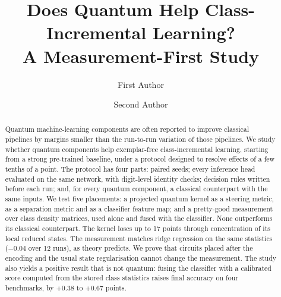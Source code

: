 \documentclass[runningheads]{llncs}
\begin{document}
\title{Does Quantum Help Class-Incremental Learning?\\
A Measurement-First Study}  %
\author{First Author \and Second Author}  %

\maketitle

\begin{abstract}
Quantum machine-learning components are often reported to improve classical
pipelines by margins smaller than the run-to-run variation of those
pipelines. We study whether quantum components help exemplar-free
class-incremental learning, starting from a strong pre-trained baseline,
under a protocol designed to resolve effects of a few tenths of a point.
The protocol has four parts: paired seeds; every inference head evaluated
on the same network, with digit-level identity checks; decision rules
written before each run; and, for every quantum component, a classical
counterpart with the same inputs. We test five placements: a projected
quantum kernel as a steering metric, as a separation metric and as a
classifier feature map; and a pretty-good measurement over class density
matrices, used alone and fused with the classifier. None outperforms its
classical counterpart. The kernel loses up to 17 points through
concentration of its local reduced states. The measurement matches ridge
regression on the same statistics ($-0.04$ over 12 runs), as theory
predicts. We prove that circuits placed after the encoding and the usual
state regularisation cannot change the measurement. The study also yields
a positive result that is not quantum: fusing the classifier with a
calibrated score computed from the stored class statistics raises final
accuracy on four benchmarks, by $+0.38$ to $+0.67$ points.
\end{abstract}










\end{document}
